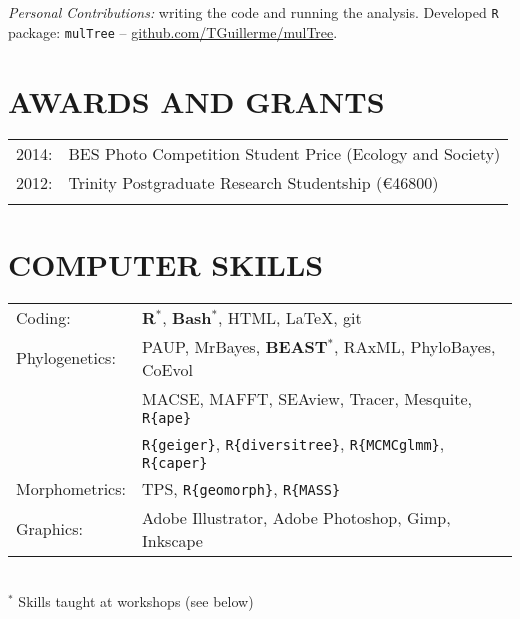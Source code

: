 \documentclass[10pt,a4paper]{article}
\begin{document}
{\textit{Personal Contributions:} writing the code and running the analysis. Developed \texttt{R} package: \texttt{mulTree} -- \href{https://github.com/TGuillerme/mulTree}{github.com/TGuillerme/mulTree}.
\bigskip
\bigskip


\section{AWARDS AND GRANTS}
\begin{tabular}{ll}
2014: & BES Photo Competition Student Price (Ecology and Society)\\
2012: & Trinity Postgraduate Research Studentship (\euro46800)\\
& \\ 
\end{tabular}
\bigskip

\section{COMPUTER SKILLS}
\begin{tabular}{ll}
Coding: & \textbf{{R}$^{*}$}, \textbf{Bash$^{*}$}, HTML, \LaTeX, git\\[1.5ex]
Phylogenetics: & PAUP, MrBayes, \textbf{BEAST$^{*}$}, RAxML, PhyloBayes, CoEvol \\
& MACSE, MAFFT, SEAview, Tracer, Mesquite, \texttt{R\{ape\}} \\
& \texttt{R\{geiger\}}, \texttt{R\{diversitree\}}, \texttt{R\{MCMCglmm\}}, \texttt{R\{caper\}} \\[1.5ex]
Morphometrics: & TPS, \texttt{R\{geomorph\}}, \texttt{R\{MASS\}} \\[1.5ex]
Graphics: & Adobe Illustrator, Adobe Photoshop, Gimp, Inkscape\\[1.5ex]
\end{tabular} \\
$^{*}$ Skills taught at workshops (see below)
\bigskip

}
\end{document}
